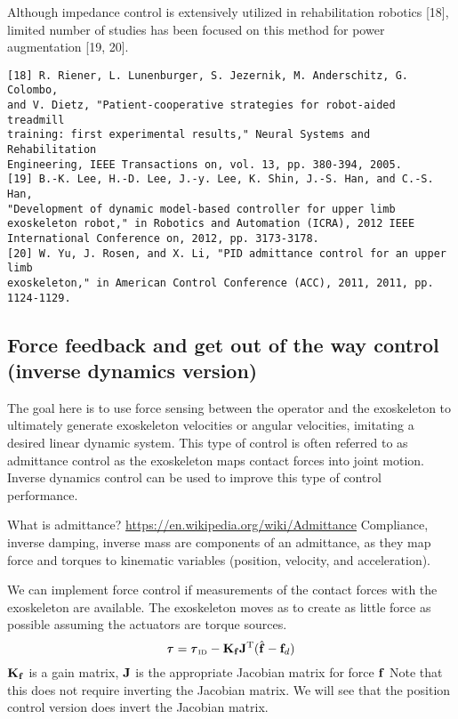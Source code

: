 \documentclass[letterpaper,12pt,fullpage]{article}
\newcommand{\invdyn}{{\mbox {\tiny ID}}}
\begin{document}
Although impedance control is extensively utilized in rehabilitation
robotics [18], limited number of studies has been focused on
this method for power augmentation [19, 20].
\begin{verbatim}
[18] R. Riener, L. Lunenburger, S. Jezernik, M. Anderschitz, G. Colombo,
and V. Dietz, "Patient-cooperative strategies for robot-aided treadmill
training: first experimental results," Neural Systems and Rehabilitation
Engineering, IEEE Transactions on, vol. 13, pp. 380-394, 2005.
[19] B.-K. Lee, H.-D. Lee, J.-y. Lee, K. Shin, J.-S. Han, and C.-S. Han,
"Development of dynamic model-based controller for upper limb
exoskeleton robot," in Robotics and Automation (ICRA), 2012 IEEE
International Conference on, 2012, pp. 3173-3178.
[20] W. Yu, J. Rosen, and X. Li, "PID admittance control for an upper limb
exoskeleton," in American Control Conference (ACC), 2011, 2011, pp.
1124-1129.
\end{verbatim}

\subsection{Force feedback and get out of the way control (inverse dynamics version)}

The goal here is to use force sensing between the operator and the
exoskeleton to ultimately generate exoskeleton velocities or angular velocities,
imitating a desired linear dynamic system.
This type of control is often referred to as admittance control as the
exoskeleton maps contact forces into joint motion.
Inverse dynamics control
can be used to improve this type of control performance.

What is admittance?
\url{https://en.wikipedia.org/wiki/Admittance}
Compliance, inverse damping, inverse mass are components of an admittance,
as they map force and torques to kinematic variables (position, velocity, and
acceleration). 

We can implement force control 
if measurements of the contact forces with
the exoskeleton are available.
The exoskeleton moves as to create as little force as possible 
assuming the actuators are torque sources.
\begin{equation}
\vtau = \vtau_{\invdyn} - \mK_{\vf} \mJ^{\tr} ( \hat{\vf} - \vf_d )
\end{equation}
${\bf K}_{{\bf f}}$ is a gain matrix, ${\bf J}$ is the appropriate Jacobian matrix for
force ${\bf f}$
Note that this does not require inverting the Jacobian matrix.
We will see that the position control version does invert the Jacobian matrix.
\end{document}
